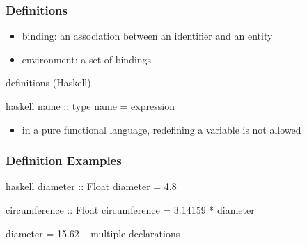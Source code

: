 \documentclass[dvipsnames]{beamer}
\theoremstyle{plain}
\begin{document}
\begin{frame}[fragile]
  \frametitle{Definitions}

  \medskip
  \begin{itemize}
    \item \alert{binding}: an association between an identifier and an entity
    \item \alert{environment}: a set of bindings
  \end{itemize}

  \begin{block}{definitions (Haskell)}
    \begin{pygments}{haskell}
name :: type
name = expression
    \end{pygments}
  \end{block}

  \pause
  \medskip
  \begin{itemize}
    \item in a pure functional language, redefining a variable is not allowed
  \end{itemize}
\end{frame}

\begin{frame}[fragile]
  \frametitle{Definition Examples}

  \begin{exampleblock}{}
    \begin{pygments}{haskell}
diameter :: Float
diameter = 4.8

circumference :: Float
circumference = 3.14159 * diameter

diameter = 15.62       -- multiple declarations
    \end{pygments}
  \end{exampleblock}
\end{frame}
\end{document}
